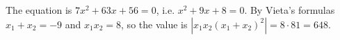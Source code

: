 The equation is $7x^2+63x+56=0$, i.e. $x^2+9x+8=0$. By Vieta's formulas $x_1+x_2=-9$ and $x_1x_2=8$, so the value is $\left|x_1x_2\left(x_1+x_2\right)^2\right|=8\cdot81=\boxed{648}$.
